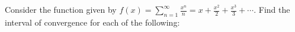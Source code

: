 Consider the function given by $\displaystyle f(x)=\sum_{n=1}^{\infty}\frac{x^n}{n}=x+\frac{x^2}{2}+\frac{x^3}{3}+\cdots$. Find the interval of convergence for each of the following:


\newpage
